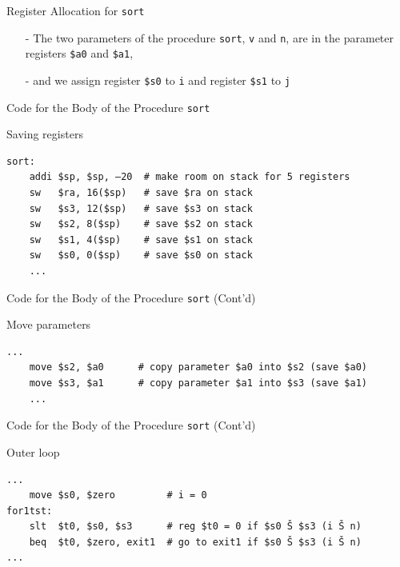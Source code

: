 \begin{frame}{Register Allocation for \texttt{sort}}
\begin{itemize}
\item[-]The two parameters of the procedure \texttt{sort}, \texttt{v} and \texttt{n}, are in the parameter registers
\texttt{\$a0} and \texttt{\$a1}, 

\item[-] and we assign register \texttt{\$s0} to \texttt{i} and register \texttt{\$s1} to \texttt{j}
\end{itemize}
\end{frame}

\begin{frame}[fragile]{Code for the Body of the Procedure \texttt{sort}}
\begin{flushleft}
Saving registers
\begin{lstlisting}[keywordstyle=\color{purple}\textbf, keywords={addi, sw}, numbers=none]
sort: 
    addi $sp, $sp, –20  # make room on stack for 5 registers
    sw   $ra, 16($sp)   # save $ra on stack
    sw   $s3, 12($sp)   # save $s3 on stack
    sw   $s2, 8($sp)    # save $s2 on stack
    sw   $s1, 4($sp)    # save $s1 on stack
    sw   $s0, 0($sp)    # save $s0 on stack
    ...
\end{lstlisting}
\end{flushleft}
\end{frame}

\begin{frame}[fragile]{Code for the Body of the Procedure \texttt{sort} (Cont'd)}
\begin{flushleft}
Move parameters 
\begin{lstlisting}[keywordstyle=\color{purple}\textbf, keywords={move}, numbers=none]
    ...
    move $s2, $a0      # copy parameter $a0 into $s2 (save $a0)
    move $s3, $a1      # copy parameter $a1 into $s3 (save $a1)
    ...
\end{lstlisting}
\end{flushleft}
\end{frame}

\begin{frame}[fragile]{Code for the Body of the Procedure \texttt{sort} (Cont'd)}
\begin{flushleft}
Outer loop
\begin{lstlisting}[keywordstyle=\color{purple}\textbf, keywords={move, slt, beq}, numbers=none]
...
    move $s0, $zero         # i = 0
for1tst: 
    slt  $t0, $s0, $s3      # reg $t0 = 0 if $s0 Š $s3 (i Š n)
    beq  $t0, $zero, exit1  # go to exit1 if $s0 Š $s3 (i Š n)
...
\end{lstlisting}
\end{flushleft}
\end{frame}

